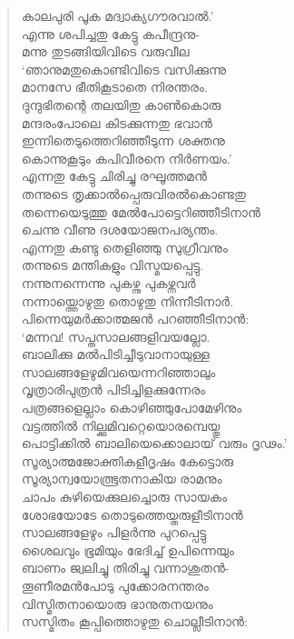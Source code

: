 \begin{verse}
കാലപുരി പൂക മദ്വാക്യഗൗരവാല്‍.’\\
എന്നു ശപിച്ചതു കേട്ടു കപീന്ദ്രനു-\\
മന്നു തുടങ്ങിയിവിടെ വരുവീല\\
‘ഞാനുമതുകൊണ്ടിവിടെ വസിക്കുന്നു\\
മാനസേ ഭീതികൂടാതെ നിരന്തരം.\\
ദുന്ദുഭിതന്റെ തലയിതു കാണ്‍കൊരു\\
മന്ദരംപോലെ കിടക്കുന്നതു ഭവാന്‍\\
ഇന്നിതെടുത്തെറിഞ്ഞീടുന്ന ശക്തനു\\
കൊന്നുകൂടും കപിവീരനെ നിര്‍ണയം.’\\
എന്നതു കേട്ടു ചിരിച്ചു രഘൂത്തമന്‍\\
തന്നുടെ തൃക്കാല്‍പ്പെരുവിരല്‍കൊണ്ടതു\\
തന്നെയെടുത്തു മേല്‍പോട്ടെറിഞ്ഞീടിനാന്‍\\
ചെന്നു വീണു ദശയോജനപര്യന്തം.\\
എന്നതു കണ്ടു തെളിഞ്ഞു സുഗ്രീവനും\\
തന്നുടെ മന്തികളും വിസ്മയപ്പെട്ടു.\\
നന്നുനന്നെന്നു പുകഴ്ന്നു പുകഴ്ന്നവര്‍\\
നന്നായ്ത്തൊഴുതു തൊഴുതു നിന്നീടിനാര്‍.\\
പിന്നെയുമര്‍ക്കാത്മജന്‍ പറഞ്ഞീടിനാന്‍:\\
‘മന്നവ! സപ്തസാലങ്ങളിവയല്ലോ.\\
ബാലിക്കു മല്‍പിടിച്ചീടുവാനായുള്ള\\
സാലങ്ങളേഴുമിവയെന്നറിഞ്ഞാലും\\
വൃത്രാരിപുത്രന്‍ പിടിച്ചിളക്കുന്നേരം\\
പത്രങ്ങളെല്ലാം കൊഴിഞ്ഞുപോമേഴിനും\\
വട്ടത്തില്‍ നില്ക്കുമിവറ്റെയൊരമ്പെയ്തു\\
പൊട്ടിക്കില്‍ ബാലിയെക്കൊലായ് വരും ദൃഢം.’\\
സൂര്യാത്മജോക്തികളീദൃഷം കേട്ടൊരു\\
സൂര്യാന്വയോത്ഭൂതനാകിയ രാമനും\\
ചാപം കുഴിയെക്കുലച്ചൊരു സായകം\\
ശോഭയോടേ തൊടുത്തെയ്തരുളീടിനാന്‍\\
സാലങ്ങളേഴും പിളര്‍ന്നു പുറപ്പെട്ടു\\
ശൈലവും ഭൂമിയും ഭേദിച്ച് ഉപിന്നെയും\\
ബാണം ജ്വലിച്ചു തിരിച്ചു വന്നാശുതന്‍-\\
തൂണീരമന്‍പോടു പുക്കോരനന്തരം\\
വിസ്മിതനായൊരു ഭാനുതനയനും\\
സസ്മിതം കൂപ്പിത്തൊഴുതു ചൊല്ലീടിനാന്‍:\\

\end{verse}

